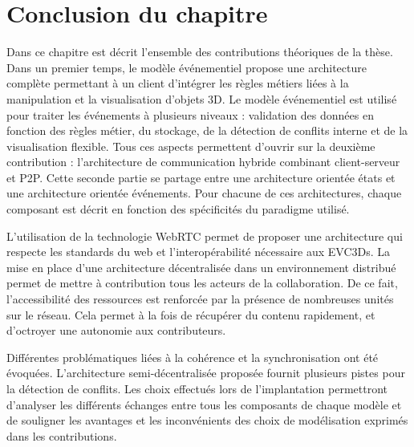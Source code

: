 

\section{Conclusion du chapitre}
Dans ce chapitre est décrit l'ensemble des contributions théoriques de la thèse. 
Dans un premier temps, le modèle événementiel propose une architecture 
complète permettant à un client d'intégrer les règles métiers liées à la manipulation 
et la visualisation d'objets 3D. Le modèle événementiel est utilisé pour traiter les 
événements à plusieurs niveaux : validation des données en fonction des règles 
métier, du stockage, de la détection de conflits interne et de la visualisation flexible. Tous 
ces aspects permettent d'ouvrir sur la deuxième contribution : 
l'architecture de communication hybride combinant client-serveur et \gls{P2P}.
Cette seconde partie se partage entre une architecture \og orientée états\fg{} et 
une architecture \og orientée événements\fg{}. Pour chacune de ces architectures, chaque composant est décrit en fonction des spécificités du paradigme utilisé. 

L'utilisation de la 
technologie WebRTC permet de proposer une 
architecture qui respecte les standards du web et l'interopérabilité nécessaire aux \glspl{EVC3D}. La mise en place d'une architecture décentralisée dans un 
environnement distribué permet de mettre à contribution tous les acteurs de la 
collaboration. De ce fait, l'accessibilité des ressources est renforcée par la 
présence de nombreuses unités sur le réseau. Cela permet à la fois 
de récupérer du contenu rapidement, et d'octroyer une autonomie aux 
contributeurs. 

Différentes problématiques liées à la cohérence et la synchronisation ont été 
évoquées. L'architecture semi-décentralisée proposée fournit plusieurs 
pistes pour la détection de conflits. Les choix effectués lors de l'implantation permettront d'analyser les différents échanges entre tous 
les composants de chaque modèle et de souligner les avantages et les 
inconvénients des choix de modélisation exprimés dans les contributions.
